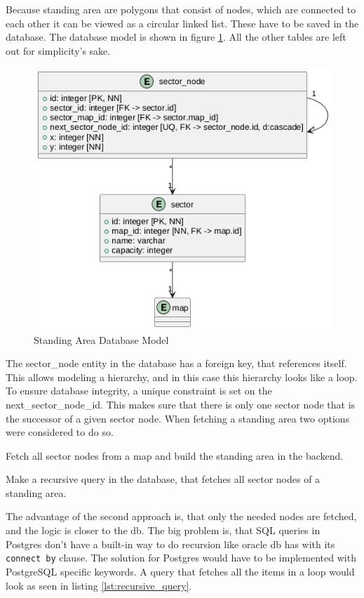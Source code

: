 Because standing area are polygons that consist of nodes, which are connected to each other it can be viewed as a circular linked list. These have to be saved in the database. The database model is shown in figure \ref{fig:standing_area_db_model}. All the other tables are left out for simplicity's sake.

\begin{figure}
    \centering
    \includegraphics[scale=0.5]{pics/standing-area-db.png}
    \caption{Standing Area Database Model}
    \label{fig:standing_area_db_model}
\end{figure}

The sector\_node entity in the database has a foreign key, that references itself. This allows modeling a hierarchy, and in this case this hierarchy looks like a loop. To ensure database integrity, a unique constraint is set on the next\_sector\_node\_id. This makes sure that there is only one sector node that is the successor of a given sector node. When fetching a standing area two options were considered to do so.

\begin{compactenum}
\item Fetch all sector nodes from a map and build the standing area in the backend.
\item Make a recursive query in the database, that fetches all sector nodes of a standing area.
\end{compactenum}

The advantage of the second approach is, that only the needed nodes are fetched, and the logic is closer to the db. The big problem is, that SQL queries in Postgres don't have  a built-in way to do recursion like oracle db has with its \texttt{connect by} clause. The solution for Postgres would have to be implemented with PostgreSQL specific keywords. A query that fetches all the items in a loop would look as seen in listing \ref{lst:recursive_query}. 

